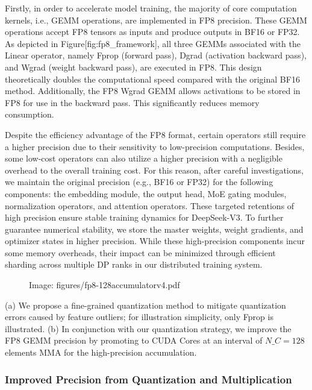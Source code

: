 \documentclass[11pt,a4paper]{article}
\begin{document}
Firstly, in order to accelerate model training, the majority of core computation kernels, i.e., GEMM operations, are implemented in FP8 precision. 
These GEMM operations accept FP8 tensors as inputs and produce outputs in BF16 or FP32. 
As depicted in Figure[fig:fp8\_framework], all three GEMMs associated with the Linear operator, namely Fprop (forward pass), Dgrad (activation backward pass), and Wgrad (weight backward pass), are executed in FP8. 
This design theoretically doubles the computational speed compared with the original BF16 method. 
Additionally, the FP8 Wgrad GEMM allows activations to be stored in FP8 for use in the backward pass. 
This significantly reduces memory consumption.

Despite the efficiency advantage of the FP8 format, certain operators still require a higher precision due to their sensitivity to low-precision computations. 
Besides, some low-cost operators can also utilize a higher precision with a negligible overhead to the overall training cost. 
For this reason, after careful investigations, we maintain the original precision (e.g., BF16 or FP32) for the following components: the embedding module, the output head, MoE gating modules, normalization operators, and attention operators. 
These targeted retentions of high precision ensure stable training dynamics for DeepSeek-V3.
To further guarantee numerical stability, we store the master weights, weight gradients, and optimizer states in higher precision. 
While these high-precision components incur some memory overheads, their impact can be minimized through efficient sharding across multiple DP ranks in our distributed training system.

\begin{figure}[h]
\caption{Image: figures/fp8-128accumulatorv4.pdf}
\end{figure}

(a) We propose a fine-grained quantization method to mitigate quantization errors caused by feature outliers; for illustration simplicity, only Fprop is illustrated. 
 (b) In conjunction with our quantization strategy, we improve the FP8 GEMM precision by promoting to CUDA Cores at an interval of $N\_C=128$ elements MMA for the high-precision accumulation.

\subsubsection{Improved Precision from Quantization and Multiplication}
\end{document}
